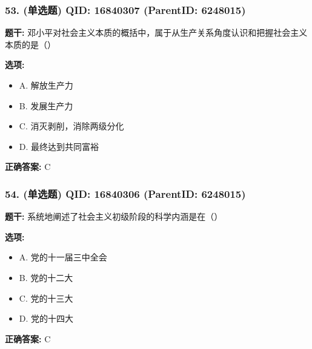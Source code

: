 \documentclass[12pt,UTF8]{ctexart}
\begin{document}
\vspace{0.3em}\hrulefill\vspace{0.7em}

\subsubsection*{53. (单选题) \small QID: 16840307 (ParentID: 6248015)}

\textbf{题干:}
邓小平对社会主义本质的概括中，属于从生产关系角度认识和把握社会主义本质的是（）



\textbf{选项:}
\begin{itemize}[leftmargin=*]

  \item A. 解放生产力

  \item B. 发展生产力

  \item C. 消灭剥削，消除两级分化

  \item D. 最终达到共同富裕

\end{itemize}

\textbf{正确答案:}
C

\vspace{0.3em}\hrulefill\vspace{0.7em}

\subsubsection*{54. (单选题) \small QID: 16840306 (ParentID: 6248015)}

\textbf{题干:}
系统地阐述了社会主义初级阶段的科学内涵是在（）



\textbf{选项:}
\begin{itemize}[leftmargin=*]

  \item A. 党的十一届三中全会

  \item B. 党的十二大

  \item C. 党的十三大

  \item D. 党的十四大

\end{itemize}

\textbf{正确答案:}
C
\end{document}
